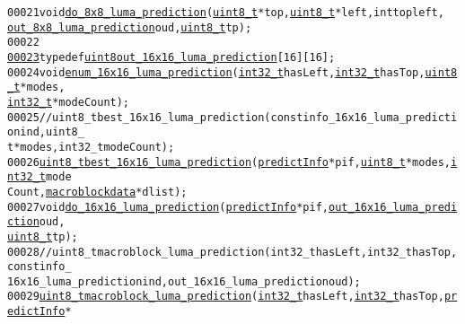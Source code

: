 \begin{footnotesize}
\begin{alltt}
00021 \textcolor{keywordtype}{void} \hyperlink{_i_predict_8cpp_a9076d5f73e7c0a6665e6e69eeaae6b10}{do_8x8_luma_prediction}(\hyperlink{_types_8h_a363e4d606232036a6b89060813c45489}{uint8_t} *top, \hyperlink{_types_8h_a363e4d606232036a6b89060813c45489}{uint8_t} *left, \textcolor{keywordtype}{int} topleft, 
      \hyperlink{_i_predict_8h_a8fffa1f1faa3bee7fe022a135a996676}{out_8x8_luma_prediction} oud, \hyperlink{_types_8h_a363e4d606232036a6b89060813c45489}{uint8_t} tp);
00022 
\hypertarget{_i_predict_8h_source_l00023}{}\hyperlink{_i_predict_8h_a8d86b35da2fd3f8936a5ed19d7f02f5c}{00023} \textcolor{keyword}{typedef} \hyperlink{_types_8h_adde6aaee8457bee49c2a92621fe22b79}{uint8} \hyperlink{_i_predict_8h_a8d86b35da2fd3f8936a5ed19d7f02f5c}{out_16x16_luma_prediction}[16][16];
00024 \textcolor{keywordtype}{void} \hyperlink{_i_predict_8cpp_a65ac7f68565585d305395aff3fdba4ae}{enum_16x16_luma_prediction}(\hyperlink{_types_8h_a115ba3a1b24a8702355c5dbd61ce01e0}{int32_t} hasLeft, \hyperlink{_types_8h_a115ba3a1b24a8702355c5dbd61ce01e0}{int32_t} hasTop, \hyperlink{_types_8h_a363e4d606232036a6b89060813c45489}{uint8_t} *modes, 
      \hyperlink{_types_8h_a115ba3a1b24a8702355c5dbd61ce01e0}{int32_t} *modeCount);
00025 \textcolor{comment}{//uint8\_t best\_16x16\_luma\_prediction(const info\_16x16\_luma\_prediction ind, uint8\_
      t *modes, int32\_t modeCount);}
00026 \hyperlink{_types_8h_a363e4d606232036a6b89060813c45489}{uint8_t} \hyperlink{_i_predict_8cpp_a361d9df978bf786c596b971b88dce5b5}{best_16x16_luma_prediction}(\hyperlink{structpredict_info}{predictInfo} *pif, \hyperlink{_types_8h_a363e4d606232036a6b89060813c45489}{uint8_t} *modes, \hyperlink{_types_8h_a115ba3a1b24a8702355c5dbd61ce01e0}{int32_t} mode
      Count, \hyperlink{structmacroblockdata}{macroblockdata} *dlist);
00027 \textcolor{keywordtype}{void} \hyperlink{_i_predict_8cpp_a90c2994887c21abf5825c0262aa283c5}{do_16x16_luma_prediction}(\hyperlink{structpredict_info}{predictInfo} *pif, \hyperlink{_i_predict_8h_a8d86b35da2fd3f8936a5ed19d7f02f5c}{out_16x16_luma_prediction} oud, 
      \hyperlink{_types_8h_a363e4d606232036a6b89060813c45489}{uint8_t} tp);
00028 \textcolor{comment}{//uint8\_t macroblock\_luma\_prediction(int32\_t hasLeft, int32\_t hasTop, const info\_
      16x16\_luma\_prediction ind, out\_16x16\_luma\_prediction oud);}
00029 \hyperlink{_types_8h_a363e4d606232036a6b89060813c45489}{uint8_t} \hyperlink{_i_predict_8cpp_a531a98450a2284027dcb0afb7f81a046}{macroblock_luma_prediction}(\hyperlink{_types_8h_a115ba3a1b24a8702355c5dbd61ce01e0}{int32_t} hasLeft, \hyperlink{_types_8h_a115ba3a1b24a8702355c5dbd61ce01e0}{int32_t} hasTop, \hyperlink{structpredict_info}{predictInfo} *

\end{alltt}
\end{footnotesize}

